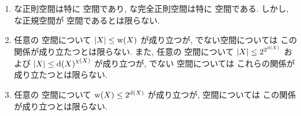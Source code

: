 \documentclass[uplatex, dvipdfmx, a4paper, 12pt, class=jsarticle, crop=false]{standalone}
\begin{document}
\renewcommand{\labelenumi}{(\alph{enumi})}
\begin{problem}[1.5.D]\label{eng-1-5-D-problem}
	\begin{enumerate}
		\item {} な正則空間は特に  空間であり,
		 な完全正則空間は特に  空間である.
		しかし,  な正規空間が  空間であるとは限らない.
		\item 任意の  空間について
		\( \cardinality{X} \leq \topweight{X} \)
		が成り立つが,  でない空間については
		この関係が成り立たつとは限らない.
		また, 任意の  空間について
		\( \cardinality{X} \leq 2^{2^{\topdensity{X}}} \)
		および
		\( \cardinality{X} \leq \topdensity{X}^{\topcharacter{X}} \)
		が成り立つが,  でない  空間については
		これらの関係が成り立たつとは限らない.
		\item 任意の  空間について
		\( \topweight{X} \leq 2^{\topdensity{X}} \)
		が成り立つが,  空間については
		この関係が成り立つとは限らない.
	\end{enumerate}
\end{problem}
\end{document}
